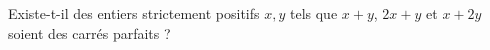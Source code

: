 Existe-t-il des entiers strictement positifs $x, y$ tels que $x + y$, $2x + y$ et $x + 2y$ soient des carrés parfaits ?
